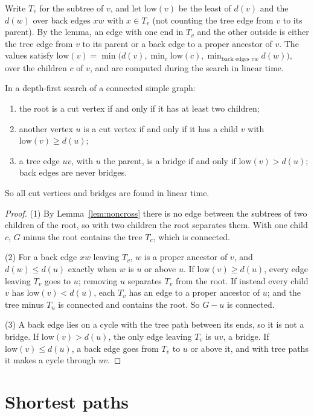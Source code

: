 Write $T_v$ for the subtree of $v$, and let $\mathrm{low}(v)$ be the least of $d(v)$ and the $d(w)$ over back edges $xw$ with $x\in T_v$ (not counting the tree edge from $v$ to its parent). By the lemma, an edge
with one end in $T_v$ and the other outside is either the tree edge from $v$ to its parent or a back edge to a proper ancestor of $v$. The values satisfy
$\mathrm{low}(v)=\min\big(d(v),\min_{c}\mathrm{low}(c),\min_{\text{back edges }vw}d(w)\big)$, over the children $c$ of $v$, and are computed during the search in linear time.

\begin{theorem}\label{thm:cutvertices}
In a depth-first search of a connected simple graph:
\begin{enumerate}
\item the root is a cut vertex if and only if it has at least two children;
\item another vertex $u$ is a cut vertex if and only if it has a child $v$ with $\mathrm{low}(v)\ge d(u)$;
\item a tree edge $uv$, with $u$ the parent, is a bridge if and only if $\mathrm{low}(v)>d(u)$; back edges are never bridges.
\end{enumerate}
So all cut vertices and bridges are found in linear time.
\end{theorem}
\begin{proof}
(1) By Lemma~\ref{lem:noncross} there is no edge between the subtrees of two children of the root, so with two children the root separates them. With one child $c$, $G$ minus the root contains the tree $T_c$, which is connected.

(2) For a back edge $xw$ leaving $T_v$, $w$ is a proper ancestor of $v$, and $d(w)\le d(u)$ exactly when $w$ is $u$ or above $u$. If $\mathrm{low}(v)\ge d(u)$, every edge leaving $T_v$ goes to $u$; removing $u$ separates
$T_v$ from the root. If instead every child $v$ has $\mathrm{low}(v)<d(u)$, each $T_v$ has an edge to a proper ancestor of $u$; and the tree minus $T_u$ is connected and contains the root. So $G-u$ is connected.

(3) A back edge lies on a cycle with the tree path between its ends, so it is not a bridge. If $\mathrm{low}(v)>d(u)$, the only edge leaving $T_v$ is $uv$, a bridge. If $\mathrm{low}(v)\le d(u)$, a back edge goes from $T_v$ to $u$ or
above it, and with tree paths it makes a cycle through $uv$.
\end{proof}

\section{Shortest paths}\label{sec:shortest}

